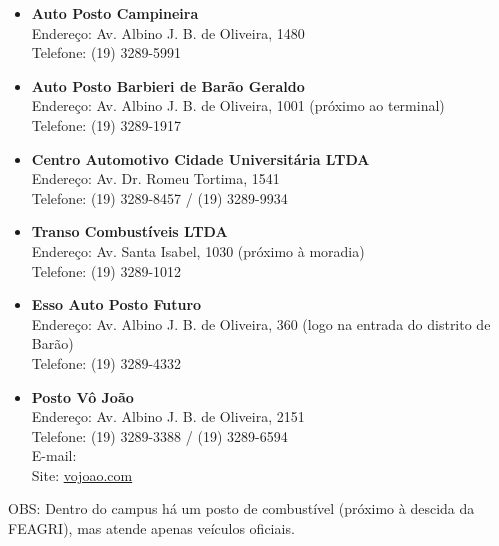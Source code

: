 \begin{itemize}
    \item   \textbf{Auto Posto Campineira}
        \\Endereço: Av. Albino J. B. de Oliveira, 1480
        \\Telefone: (19) 3289-5991

    \item   \textbf{Auto Posto Barbieri de Barão Geraldo}
        \\Endereço: Av. Albino J. B. de Oliveira, 1001 (próximo ao terminal)
        \\Telefone: (19) 3289-1917

    \item   \textbf{Centro Automotivo Cidade Universitária LTDA}
        \\Endereço: Av. Dr. Romeu Tortima, 1541
        \\Telefone: (19) 3289-8457 / (19) 3289-9934

    \item   \textbf{Transo Combustíveis LTDA}
        \\Endereço: Av. Santa Isabel, 1030 (próximo à moradia)
        \\Telefone: (19) 3289-1012

    \item   \textbf{Esso Auto Posto Futuro}
        \\Endereço: Av. Albino J. B. de Oliveira, 360 (logo na entrada do distrito de Barão)
        \\Telefone: (19) 3289-4332

    \item   \textbf{Posto Vô João}
        \\Endereço: Av. Albino J. B. de Oliveira, 2151
        \\Telefone: (19) 3289-3388 / (19) 3289-6594
        \\E-mail: 
        \\Site: \url{vojoao.com}
\end{itemize}

OBS: Dentro do campus há um posto de combustível (próximo à descida da FEAGRI),
mas atende apenas veículos oficiais.
